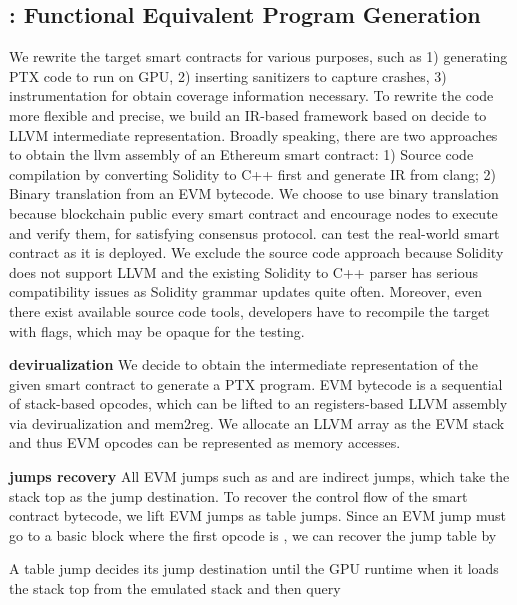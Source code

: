     
\subsection{{\translator}: Functional Equivalent Program Generation}
\label{design:translator}
We rewrite the target smart contracts for various purposes, such as 1) generating PTX code to run on GPU, 2) inserting sanitizers to capture crashes, 3) instrumentation for obtain coverage information necessary. 
To rewrite the code more flexible and precise, we build an IR-based framework based on decide to LLVM intermediate representation.
%
Broadly speaking, there are two approaches to obtain the llvm assembly of an Ethereum smart contract: 1) Source code compilation by converting Solidity to C++ first and generate IR from clang\cite{}; 2) Binary translation from an EVM bytecode. 
We choose to use binary translation because blockchain public every smart contract and encourage nodes to execute and verify them, for satisfying consensus protocol. {\tool} can test the real-world smart contract as it is deployed. 
We exclude the source code approach because Solidity does not support LLVM and the existing Solidity to C++ parser has serious compatibility issues as Solidity grammar updates quite often. Moreover, even there exist available source code tools, developers have to recompile the target with flags, which may be opaque for the testing. 


\noindent \textbf{devirualization}
We decide to obtain the intermediate representation of the given smart contract to generate a PTX program. 
EVM bytecode is a sequential of stack-based opcodes, which can be lifted to an registers-based LLVM assembly via devirualization and mem2reg\cite{}. 
We allocate an LLVM array as the EVM stack and thus EVM opcodes can be represented as memory accesses. 

\noindent \textbf{jumps recovery}
All EVM jumps such as  and  are indirect jumps, which take the stack top as the jump destination. 
To recover the control flow of the smart contract bytecode, we lift EVM jumps as table jumps. 
Since an EVM jump must go to a basic block where the first opcode is , we can recover the jump table by 

A table jump decides its jump destination until the GPU runtime when it loads the stack top from the emulated stack and then query



